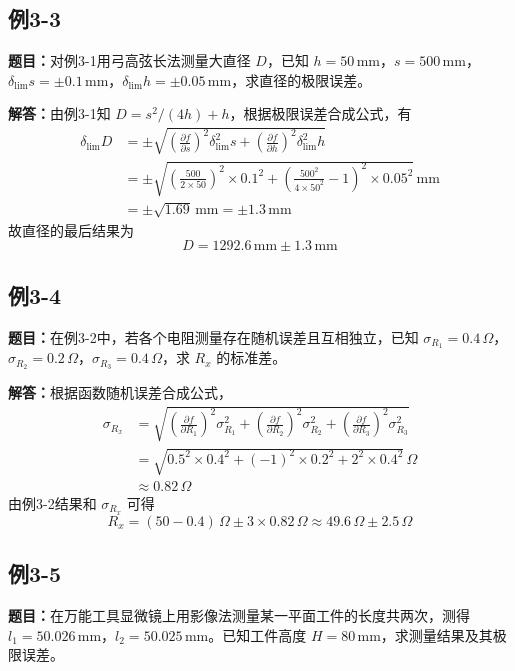 \documentclass[UTF8,zihao=-4]{ctexart}
\newcommand{\problem}[1]{\subsection*{#1}}
\newcommand{\timu}{\noindent\textbf{题目：}}
\newcommand{\jieda}{\noindent\textbf{解答：}}
\begin{document}
\problem{例3-3}
\timu 对例3-1用弓高弦长法测量大直径 $D$，已知
$h=50\,\mathrm{mm}$，$s=500\,\mathrm{mm}$，$\delta_{\lim}s=\pm0.1\,\mathrm{mm}$，$\delta_{\lim}h=\pm0.05\,\mathrm{mm}$，求直径的极限误差。

\jieda 由例3-1知 $D=s^2/(4h)+h$，根据极限误差合成公式，有
\begin{equation*}
\begin{aligned}
    \delta_{\lim}D
    &=\pm\sqrt{\left(\frac{\partial f}{\partial s}\right)^2\delta_{\lim}^2s+
    \left(\frac{\partial f}{\partial h}\right)^2\delta_{\lim}^2h}\\
    &=\pm\sqrt{\left(\frac{500}{2\times50}\right)^2\times0.1^2+
    \left(\frac{500^2}{4\times50^2}-1\right)^2\times0.05^2}\,\mathrm{mm}\\
    &=\pm\sqrt{1.69}\,\mathrm{mm}=\pm1.3\,\mathrm{mm}
\end{aligned}
\end{equation*}
故直径的最后结果为
\begin{equation*}
    D=1292.6\,\mathrm{mm}\pm1.3\,\mathrm{mm}
\end{equation*}

\problem{例3-4}
\timu 在例3-2中，若各个电阻测量存在随机误差且互相独立，已知
$\sigma_{R_1}=0.4\,\Omega$，$\sigma_{R_2}=0.2\,\Omega$，$\sigma_{R_3}=0.4\,\Omega$，求 $R_x$ 的标准差。

\jieda 根据函数随机误差合成公式，
\begin{equation*}
\begin{aligned}
    \sigma_{R_x}
    &=\sqrt{\left(\frac{\partial f}{\partial R_1}\right)^2\sigma_{R_1}^2+
    \left(\frac{\partial f}{\partial R_2}\right)^2\sigma_{R_2}^2+
    \left(\frac{\partial f}{\partial R_3}\right)^2\sigma_{R_3}^2}\\
    &=\sqrt{0.5^2\times0.4^2+(-1)^2\times0.2^2+2^2\times0.4^2}\,\Omega\\
    &\approx0.82\,\Omega
\end{aligned}
\end{equation*}
由例3-2结果和 $\sigma_{R_x}$ 可得
\begin{equation*}
    R_x=(50-0.4)\,\Omega\pm3\times0.82\,\Omega\approx49.6\,\Omega\pm2.5\,\Omega
\end{equation*}

\problem{例3-5}
\timu 在万能工具显微镜上用影像法测量某一平面工件的长度共两次，测得 $l_1=50.026\,\mathrm{mm}$，$l_2=50.025\,\mathrm{mm}$。已知工件高度 $H=80\,\mathrm{mm}$，求测量结果及其极限误差。
\end{document}
